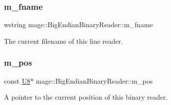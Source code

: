 \subsubsection{\texorpdfstring{m\+\_\+fname}{m\_fname}}
{\footnotesize\ttfamily wstring mage\+::\+Big\+Endian\+Binary\+Reader\+::m\+\_\+fname\hspace{0.3cm}{\ttfamily [private]}}

The current filename of this line reader. \hypertarget{classmage_1_1_big_endian_binary_reader_a7dbfc5ce1712e431f75d80a4f7a56e33}{}\label{classmage_1_1_big_endian_binary_reader_a7dbfc5ce1712e431f75d80a4f7a56e33} 
\subsubsection{\texorpdfstring{m\+\_\+pos}{m\_pos}}
{\footnotesize\ttfamily const \hyperlink{namespacemage_afc638980bc6154f15af5e2d93a0e0ea9}{U8}$\ast$ mage\+::\+Big\+Endian\+Binary\+Reader\+::m\+\_\+pos\hspace{0.3cm}{\ttfamily [private]}}

A pointer to the current position of this binary reader. 